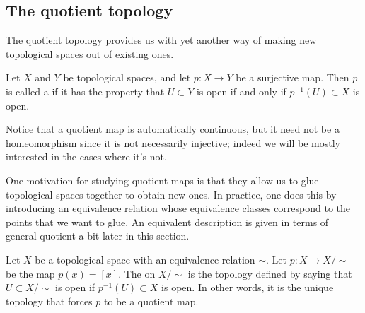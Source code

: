 \subsection{The quotient topology}
The quotient topology provides us with yet another way of making new topological spaces out of existing ones.

\begin{defn}
  Let $X$ and $Y$ be topological spaces, and let $p : X \to Y$ be a surjective map. Then $p$ is called a  if it has the property that $U \subset Y$ is open if and only if $p^{-1}(U) \subset X$ is open.
\end{defn}
Notice that a quotient map is automatically continuous, but it need not be a homeomorphism since it is not necessarily injective; indeed we will be mostly interested in the cases where it's not.

One motivation for studying quotient maps is that they allow us to glue topological spaces together to obtain new ones. In practice, one does this by introducing an equivalence relation whose equivalence classes correspond to the points that we want to glue. An equivalent description is given in terms of general quotient a bit later in this section.

\begin{defn}
  \label{def-quotient-topology}
  Let $X$ be a topological space with an equivalence relation $\sim$. Let $p : X \to X/\!\sim$ be the map $p(x) = [x]$. The  on $X/\!\sim$ is the topology defined by saying that $U \subset X/\!\sim$ is open if $p^{-1}(U) \subset X$ is open. In other words, it is the unique topology that forces $p$ to be a quotient map.
\end{defn}

